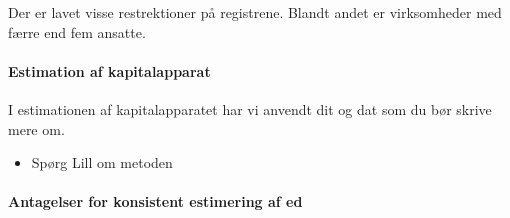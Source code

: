 Der er lavet visse restrektioner på registrene. Blandt andet er virksomheder med færre end fem ansatte. 

\paragraph{Estimation af kapitalapparat} 
I estimationen af kapitalapparatet har vi anvendt dit og dat som du bør skrive mere om.

\begin{itemize}
	\item Spørg Lill om metoden
\end{itemize}

\paragraph{Antagelser for konsistent estimering af ed}
